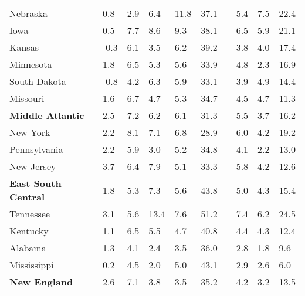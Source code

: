 {\begin{tabular}{p{30mm} R{7mm} R{7mm} R{7mm} R{7mm} 
             R{7mm} p{0mm} R{9mm} R{9mm} R{10mm} }
\hspace{3mm}  Nebraska  & 0.8 & 2.9 & 6.4 & 11.8 & 37.1 &  & 5.4 & 7.5 & 22.4 \\
\hspace{3mm}  Iowa  & 0.5 & 7.7 & 8.6 & 9.3 & 38.1 &  & 6.5 & 5.9 & 21.1 \\
\hspace{3mm}  Kansas  & -0.3 & 6.1 & 3.5 & 6.2 & 39.2 &  & 3.8 & 4.0 & 17.4 \\
\hspace{3mm}  Minnesota  & 1.8 & 6.5 & 5.3 & 5.6 & 33.9 &  & 4.8 & 2.3 & 16.9 \\
\hspace{3mm}  South Dakota  & -0.8 & 4.2 & 6.3 & 5.9 & 33.1 &  & 3.9 & 4.9 & 14.4 \\
\hspace{3mm}  Missouri  & 1.6 & 6.7 & 4.7 & 5.3 & 34.7 &  & 4.5 & 4.7 & 11.3 \\
\hspace{1mm} \textbf{Middle Atlantic}  & 2.5 & 7.2 & 6.2 & 6.1 & 31.3 &  & 5.5 & 3.7 & 16.2 \\
\hspace{3mm}  New York  & 2.2 & 8.1 & 7.1 & 6.8 & 28.9 &  & 6.0 & 4.2 & 19.2 \\
\hspace{3mm}  Pennsylvania  & 2.2 & 5.9 & 3.0 & 5.2 & 34.8 &  & 4.1 & 2.2 & 13.0 \\
\hspace{3mm}  New Jersey  & 3.7 & 6.4 & 7.9 & 5.1 & 33.3 &  & 5.8 & 4.2 & 12.6 \\
\hspace{1mm} \textbf{East South Central}  & 1.8 & 5.3 & 7.3 & 5.6 & 43.8 &  & 5.0 & 4.3 & 15.4 \\
\hspace{3mm}  Tennessee  & 3.1 & 5.6 & 13.4 & 7.6 & 51.2 &  & 7.4 & 6.2 & 24.5 \\
\hspace{3mm}  Kentucky  & 1.1 & 6.5 & 5.5 & 4.7 & 40.8 &  & 4.4 & 4.3 & 12.4 \\
\hspace{3mm}  Alabama  & 1.3 & 4.1 & 2.4 & 3.5 & 36.0 &  & 2.8 & 1.8 & 9.6 \\
\hspace{3mm}  Mississippi  & 0.2 & 4.5 & 2.0 & 5.0 & 43.1 &  & 2.9 & 2.6 & 6.0 \\
\hspace{1mm} \textbf{New England}  & 2.6 & 7.1 & 3.8 & 3.5 & 35.2 &  & 4.2 & 3.2 & 13.5 \\

\end{tabular}}
